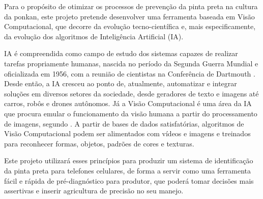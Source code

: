 Para o propósito de otimizar os processos de prevenção da pinta preta na cultura da ponkan, este projeto pretende desenvolver uma ferramenta baseada em Visão Computacional, que decorre da evolução tecno-científica e, mais especificamente, da evolução dos algoritmos de Inteligência Artificial (IA). 

IA é compreendida como campo de estudo dos sistemas capazes de realizar tarefas propriamente humanas, nascida no período da Segunda Guerra Mundial e oficializada em 1956, com a reunião de cientistas na Conferência de Dartmouth \cite{coelho2012turing}. Desde então, a IA cresceu ao ponto de, atualmente, automatizar e integrar soluções em diversos setores da sociedade, desde geradores de texto e imagens até carros, robôs e drones autônomos. Já a Visão Computacional é uma área da IA que procura emular o funcionamento da visão humana a partir do processamento de imagens, segundo \textcite{marengoni2009opencv}. A partir de bases de dados satisfatórias, algoritmos de Visão Computacional podem ser alimentados com vídeos e imagens e treinados para reconhecer formas, objetos, padrões de cores e texturas.

Este projeto utilizará esses princípios para produzir um sistema de identificação da pinta preta para telefones celulares, de forma a servir como uma ferramenta fácil e rápida de pré-diagnóstico para produtor, que poderá tomar decisões mais assertivas e inserir agricultura de precisão no seu manejo.